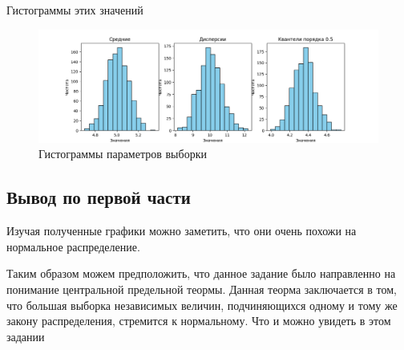 \documentclass{article}
\begin{document}
Гистограммы этих значений
\begin{figure}[H]
      \centering
      \includegraphics[width=1\linewidth]{Python/first-exp}
      \caption{Гистограммы параметров выборки}\label{fig:figure}
\end{figure}

\subsection{Вывод по первой части}
Изучая полученные графики можно заметить, что они очень похожи на нормальное распределение.

Таким образом можем предположить, что данное задание было направленно на понимание центральной предельной теормы.
Данная теорма заключается в том, что большая выборка независимых величин, подчиняющихся одному и тому же закону распределения, стремится к нормальному.
Что и можно увидеть в этом задании
\end{document}
